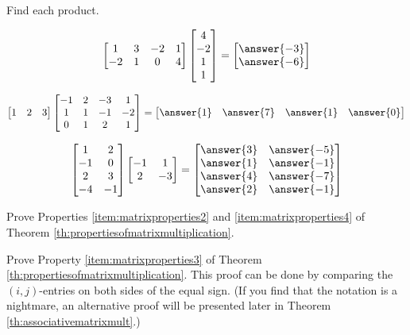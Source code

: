 \documentclass{ximera}
\begin{document}
\begin{problem}
Find each product.
\begin{problem}
$$\begin{bmatrix}1&3&-2&1\\-2&1&0&4\end{bmatrix}\begin{bmatrix}4\\-2\\1\\1\end{bmatrix}=\begin{bmatrix}\answer{-3}\\\answer{-6}\end{bmatrix}$$
\end{problem}
\begin{problem}
$$\begin{bmatrix}1&2&3\end{bmatrix}\begin{bmatrix}-1&2&-3&1\\1&1&-1&-2\\0&1&2&1\end{bmatrix}=\begin{bmatrix}\answer{1}&\answer{7}&\answer{1}&\answer{0}\end{bmatrix}$$
\end{problem}
\begin{problem}
$$\begin{bmatrix}1&2\\-1&0\\2&3\\-4&-1\end{bmatrix}\begin{bmatrix}-1&1\\2&-3\end{bmatrix}=\begin{bmatrix}\answer{3}&\answer{-5}\\\answer{1}&\answer{-1}\\\answer{4}&\answer{-7}\\\answer{2}&\answer{-1}\end{bmatrix}
$$
\end{problem}
\end{problem}

\begin{problem}
Prove Properties \ref{item:matrixproperties2} and \ref{item:matrixproperties4} of Theorem \ref{th:propertiesofmatrixmultiplication}.
\end{problem}

\begin{problem}
Prove Property \ref{item:matrixproperties3} of Theorem \ref{th:propertiesofmatrixmultiplication}.  This proof can be done by comparing the $(i,j)$-entries on both sides of the equal sign.  (If you find that the notation is a nightmare, an alternative proof will be presented later in Theorem \ref{th:associativematrixmult}.)
\end{problem}
\end{document}
